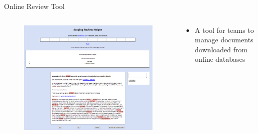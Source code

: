 \documentclass[9pt]{beamer}
\begin{document}
\begin{frame}{Online Review Tool}

\begin{columns}
	\begin{column}{0.5\linewidth}
		\begin{center}
			\begin{figure}
				\includegraphics[width=0.85\linewidth]{images/screen.png}
			\end{figure}
			\begin{figure}
			\end{figure}
		\end{center}
	\end{column}
	\begin{column}{0.5\linewidth}
		\begin{center}
			\begin{itemize}
				\item A tool for teams to manage documents downloaded from online databases

\end{itemize}
\end{center}
\end{column}
\end{columns}
\end{frame}
\end{document}
